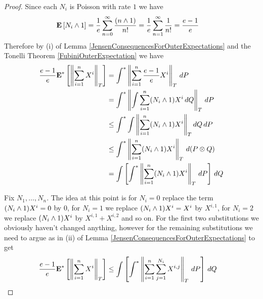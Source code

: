 \begin{proof}
Since each $N_i$ is Poisson with rate $1$ we have 
\begin{align*}
\textbf{E}\left[N_i  \wedge 1\right] &= \frac{1}{e} \sum_{n=0}^\infty \frac{(n \wedge 1)}{n!} = \frac{1}{e} \sum_{n=1}^\infty \frac{1}{n!} = \frac{e-1}{e}
\end{align*}
Therefore by (i) of Lemma \ref{JensenConsequencesForOuterExpectations} and the Tonelli Theorem \ref{FubiniOuterExpectation} we have
\begin{align*}
\frac{e-1}{e} \textbf{E}^*\left[\left \lVert \sum_{i=1}^n X^i \right \rVert_T\right] 
&= \int^* \left \lVert  \sum_{i=1}^n \frac{e-1}{e}  X^i \right \rVert_T \, dP \\
&= \int^* \left \lVert \int \sum_{i=1}^n (N_i \wedge 1)  X^i \, dQ \right \rVert_T \, dP \\
&\leq \int^* \int \left \lVert  \sum_{i=1}^n (N_i \wedge 1) X^i \right \rVert_T dQ \, dP \\
&\leq \int^* \left \lVert  \sum_{i=1}^n (N_i \wedge 1) X^i \right \rVert_T \, d(P \otimes Q) \\
&= \int \left [ \int^* \left \lVert  \sum_{i=1}^n (N_i \wedge 1) X^i \right \rVert_T \, dP\right ] \, dQ \\
\end{align*}

Fix $N_1, \dotsc, N_n$.  The idea at this point is for $N_i=0$ replace the term $(N_i \wedge 1) X^i=0$ by $0$, for $N_i=1$ we replace $(N_i \wedge 1) X^i=X^i$ by $X^{i,1}$, for $N_i=2$ we replace $(N_i \wedge 1) X^i$ by $X^{i,1} + X^{i,2}$ and so on.  For the first two substitutions we obviously haven't changed anything, however for the remaining substitutions we need to argue as in (ii) of Lemma \ref{JensenConsequencesForOuterExpectations} to get
\begin{align*}
\frac{e-1}{e} \textbf{E}^*\left[\left \lVert \sum_{i=1}^n X^i \right \rVert_T\right]  &\leq \int \left [ \int^* \left \lVert \sum_{i=1}^n \sum_{j=1}^{N_i} X^{i,j} \right \rVert_T \, dP \right ] \, dQ
\end{align*}


\end{proof}
